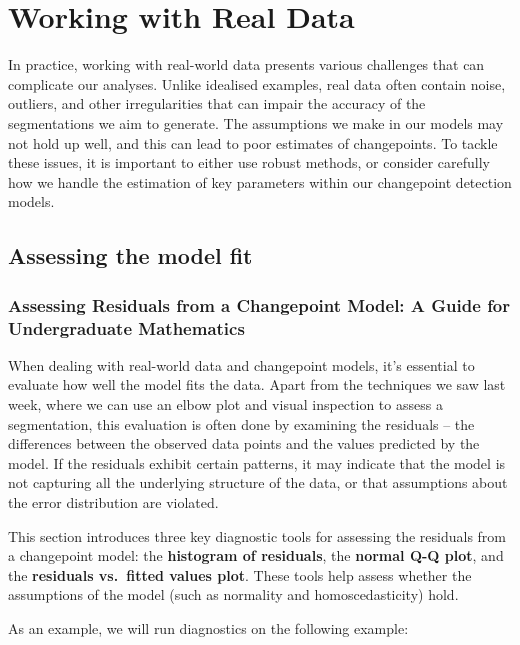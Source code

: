 \documentclass[
  letterpaper,
  DIV=11,
  numbers=noendperiod]{scrreprt}
\begin{document}

\chapter{Working with Real Data}\label{working-with-real-data}

In practice, working with real-world data presents various challenges
that can complicate our analyses. Unlike idealised examples, real data
often contain noise, outliers, and other irregularities that can impair
the accuracy of the segmentations we aim to generate. The assumptions we
make in our models may not hold up well, and this can lead to poor
estimates of changepoints. To tackle these issues, it is important to
either use robust methods, or consider carefully how we handle the
estimation of key parameters within our changepoint detection models.

\section{Assessing the model fit}\label{assessing-the-model-fit}

\subsection{Assessing Residuals from a Changepoint Model: A Guide for
Undergraduate
Mathematics}\label{assessing-residuals-from-a-changepoint-model-a-guide-for-undergraduate-mathematics}

When dealing with real-world data and changepoint models, it's essential
to evaluate how well the model fits the data. Apart from the techniques
we saw last week, where we can use an elbow plot and visual inspection
to assess a segmentation, this evaluation is often done by examining the
residuals -- the differences between the observed data points and the
values predicted by the model. If the residuals exhibit certain
patterns, it may indicate that the model is not capturing all the
underlying structure of the data, or that assumptions about the error
distribution are violated.

This section introduces three key diagnostic tools for assessing the
residuals from a changepoint model: the \textbf{histogram of residuals},
the \textbf{normal Q-Q plot}, and the \textbf{residuals vs.~fitted
values plot}. These tools help assess whether the assumptions of the
model (such as normality and homoscedasticity) hold.

As an example, we will run diagnostics on the following example:
\end{document}
